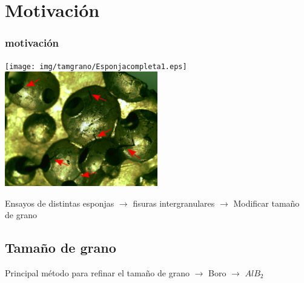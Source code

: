 \documentclass[usenames,dvipsnames]{beamer}
\begin{document}




\section{Motivación}

\begin{frame}
\frametitle{motivación}


\begin{center}

\texttt{[image: img/tamgrano/Esponjacompleta1.eps]}
\includegraphics[width=0.5\textwidth]{img/tamgrano/Fisuras.eps}

\end{center}

Ensayos de distintas esponjas $\rightarrow$ fisuras intergranulares $\rightarrow$ Modificar tamaño de grano
%  
\end{frame}


\subsection{Tamaño de grano}


\begin{frame}
 Principal método para refinar el tamaño de grano $\rightarrow$ Boro $\rightarrow$ $AlB_2$
\end{frame}
\end{document}
